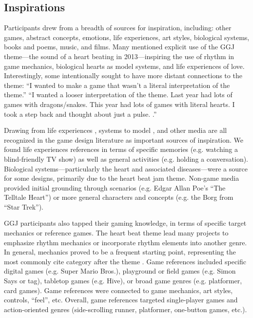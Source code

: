\documentclass{sig-alternate}
\begin{document}

\subsection{Inspirations}
Participants drew from a breadth of sources for inspiration, including: other games, abstract concepts, emotions, life experiences, art styles, biological systems, books and poems, music, and films. Many mentioned explicit use of the GGJ theme---the sound of a heart beating in 2013---inspiring the use of rhythm in game mechanics, biological hearts as model systems, and life experiences of love. Interestingly, some intentionally sought to have more distant connections to the theme:
``I wanted to make a game that wasn't a literal interpretation of the theme.'' ``I wanted a looser interpretation of the theme. Last year had lots of games with dragons/snakes. This year had lots of games with literal hearts. I took a step back and thought about just a pulse.
.''

Drawing from life experiences \cite{anthropy2012:zinesters}, systems to model \cite{crawford1984:gamedesign}, and other media \cite{bogost2011:howto} are all recognized in the game design literature as important sources of inspiration.
We found life experiences references in terms of specific memories (e.g. watching a blind-friendly TV show) as well as general activities (e.g. holding a conversation).
Biological systems---particularly the heart and associated diseases---were a source for some designs, primarily due to the heart beat jam theme.
Non-game media provided initial grounding through scenarios (e.g. Edgar Allan Poe's ``The Telltale Heart'') or more general characters and concepts (e.g. the Borg from ``Star Trek'').

GGJ participants also tapped their gaming knowledge, in terms of specific target mechanics or reference games.
The heart beat theme lead many projects to emphasize rhythm mechanics or incorporate rhythm elements into another genre. In general, mechanics proved to be a frequent starting point, representing the most commonly cite category  after the theme .
Game references included specific digital games (e.g. Super Mario Bros.), playground or field games (e.g. Simon Says or tag), tabletop games (e.g. Hive), or broad game genres (e.g. platformer, card games). Game references were connected to game mechanics, art styles, controls, ``feel'', etc. Overall, game references targeted single-player games and action-oriented genres (side-scrolling runner, platformer, one-button games, etc.).
\end{document}
